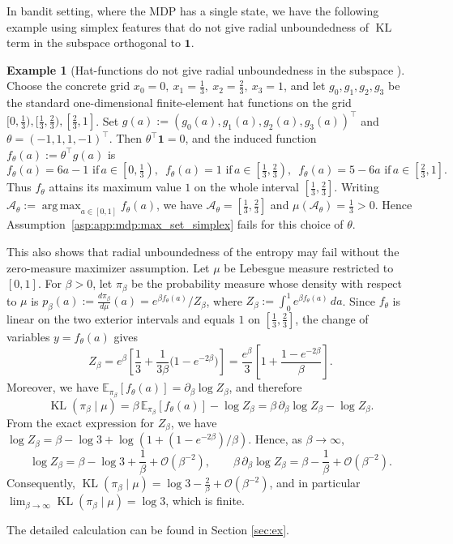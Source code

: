 \documentclass{amsart}
\theoremstyle{definition}
\newtheorem{example}{Example}
\begin{document}
In bandit setting, where the MDP has a single state, we have the following example using simplex features that do not give radial unboundedness of $\operatorname{KL}$ term in the subspace orthogonal to $\mathbf 1$.
\begin{example}[Hat-functions do not give radial unboundedness in the subspace ]\label{ex:hat_func_short}
Choose the concrete grid $x_0=0,\ x_1=\frac13,\ x_2=\frac23,\ x_3=1$, and let $g_0,g_1,g_2,g_3$ be the standard one-dimensional finite-element hat functions on the grid $[0,\frac13), [\frac13,\frac23), [\frac23,1]$. Set $g(a):=(g_0(a),g_1(a),g_2(a),g_3(a))^\top$ and $\theta=(-1,1,1,-1)^\top$. Then $\theta^\top \mathbf 1=0$, and the induced function $f_\theta(a):=\theta^\top g(a)$ is
\[
f_\theta(a) = 6a-1\,\,\text{if}\, a\in\left[0,\tfrac13\right),\,\,\,
f_\theta(a) = 1\,\,\text{if}\, a\in\left[\tfrac13,\tfrac23\right),\,\,\,
f_\theta(a) = 5-6a\,\,\text{if}\, a\in\left[\tfrac23,1\right].
\]
Thus $f_\theta$ attains its maximum value $1$ on the whole interval $[\frac13,\frac23]$. Writing $\mathcal A_\theta:=\operatorname*{arg\,max}_{a\in[0,1]}f_\theta(a)$, we have $\mathcal A_\theta=[\frac13,\frac23]$ and $\mu(\mathcal A_\theta)=\frac13>0$. Hence Assumption~\ref{asp:app:mdp:max_set_simplex} fails for this choice of $\theta$.

This also shows that radial unboundedness of the entropy may fail without the zero-measure maximizer assumption. Let $\mu$ be Lebesgue measure restricted to $[0,1]$. For $\beta>0$, let $\pi_\beta$ be the probability measure whose density with respect to $\mu$ is $p_\beta(a):=\frac{d\pi_\beta}{d\mu}(a)=e^{\beta f_\theta(a)}/Z_\beta$, where $Z_\beta:=\int_0^1 e^{\beta f_\theta(a)}\,da$. 
Since $f_\theta$ is linear on the two exterior intervals and equals $1$ on $[\frac13,\frac23]$, the change of variables $y=f_\theta(a)$ gives
\[
Z_\beta
=
e^\beta
\left[
\frac13+\frac{1}{3\beta}\bigl(1-e^{-2\beta}\bigr)
\right]
=
\frac{e^\beta}{3}
\left[
1+\frac{1-e^{-2\beta}}{\beta}
\right].
\]
Moreover, we have $\mathbb E_{\pi_\beta}[f_\theta(a)]=\partial_\beta\log Z_\beta$, and therefore
\[
\operatorname{KL}(\pi_\beta\mid\mu)
=
\beta\,\mathbb E_{\pi_\beta}[f_\theta(a)]-\log Z_\beta
=
\beta\,\partial_\beta\log Z_\beta-\log Z_\beta .
\]
From the exact expression for $Z_\beta$, we have $\log Z_\beta=\beta-\log 3+\log(1+(1-e^{-2\beta})/\beta)$. Hence, as $\beta\to\infty$,
\[
\log Z_\beta
=
\beta-\log 3+\frac1\beta+\mathcal O(\beta^{-2}),
\qquad
\beta\,\partial_\beta\log Z_\beta
=
\beta-\frac1\beta+\mathcal O(\beta^{-2}).
\]
Consequently, $\operatorname{KL}(\pi_\beta\mid\mu) = \log 3-\frac{2}{\beta}+\mathcal O(\beta^{-2})$,
and in particular $\lim_{\beta\to\infty}\operatorname{KL}(\pi_\beta\mid\mu)=\log 3$, which is finite.
\end{example}
The detailed calculation can be found in Section \ref{sec:ex}.
\end{document}
